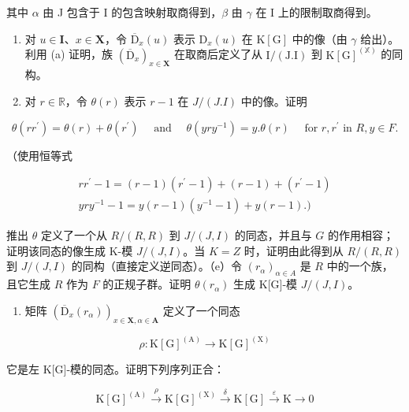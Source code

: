 其中 \(\alpha\) 由 J 包含于 I 的包含映射取商得到，\(\beta\) 由 \(\gamma\) 在 I 上的限制取商得到。

\begin{enumerate}
\def\labelenumi{(\alph{enumi})}
\setcounter{enumi}{2}
\item
  对 \(u \in \mathbf{I}\)、\(x \in \mathbf{X}\)，令 \(\overline{\mathrm{D}}_x(u)\) 表示 \(\mathrm{D}_x(u)\) 在 \(\mathrm{K}[\mathrm{G}]\) 中的像（由 \(\gamma\) 给出）。利用 (a) 证明，族 \((\overline{\mathrm{D}}_x)_{x \in \mathbf{X}}\) 在取商后定义了从 \(\mathrm{I} / (\mathrm{J}. \mathrm{I})\) 到 \(\mathrm{K}[\mathrm{G}]^{(\mathbb{X})}\) 的同构。
\item
  对 \(r \in \mathbb{R}\)，令 \(\theta(r)\) 表示 \(r - 1\) 在 \(J/(J.I)\) 中的像。证明
\end{enumerate}

\[
\theta (r r ^ {\prime}) = \theta (r) + \theta (r ^ {\prime}) \quad \text { and } \quad \theta (y r y ^ {- 1}) = y. \theta (r) \quad \text { for   } r, r ^ {\prime} \text {   in   } R, y \in F.
\]

（使用恒等式

\[
\begin{array}{c} {r r ^ {\prime} - 1 = (r - 1) (r ^ {\prime} - 1) + (r - 1) + (r ^ {\prime} - 1)} \\ {y r y ^ {- 1} - 1 = y (r - 1) (y ^ {- 1} - 1) + y (r - 1).)} \end{array}
\]

推出 \(\theta\) 定义了一个从 \(R/(R, R)\) 到 \(J/(J, I)\) 的同态，并且与 \(G\) 的作用相容；证明该同态的像生成 K-模 \(J/(J, I)\)。当 \(K = Z\) 时，证明由此得到从 \(R/(R, R)\) 到 \(J/(J, I)\) 的同构（直接定义逆同态）。（e）令 \((r_{\alpha})_{\alpha \in A}\) 是 \(R\) 中的一个族，且它生成 \(R\) 作为 \(F\) 的正规子群。证明 \(\theta(r_{\alpha})\) 生成 K{[}G{]}-模 \(J/(J, I)\)。

\begin{enumerate}
\def\labelenumi{(\alph{enumi})}
\setcounter{enumi}{5}
\tightlist
\item
  矩阵 \((\overline{\mathrm{D}}_x(r_\alpha))_{x\in \mathbf{X},\alpha \in \mathbf{A}}\) 定义了一个同态
\end{enumerate}

\[
\rho \colon \mathrm{K} [ \mathrm{G} ] ^ {(\mathrm{A})} \rightarrow \mathrm{K} [ \mathrm{G} ] ^ {(\mathrm{X})}
\]

它是左 K{[}G{]}-模的同态。证明下列序列正合：

\[
\mathrm{K} [ \mathrm{G} ] ^ {(\mathrm{A})} \xrightarrow {\rho} \mathrm{K} [ \mathrm{G} ] ^ {(\mathrm{X})} \xrightarrow {\delta} \mathrm{K} [ \mathrm{G} ] \xrightarrow {\varepsilon} \mathrm{K} \longrightarrow 0\tag{**}
\]

